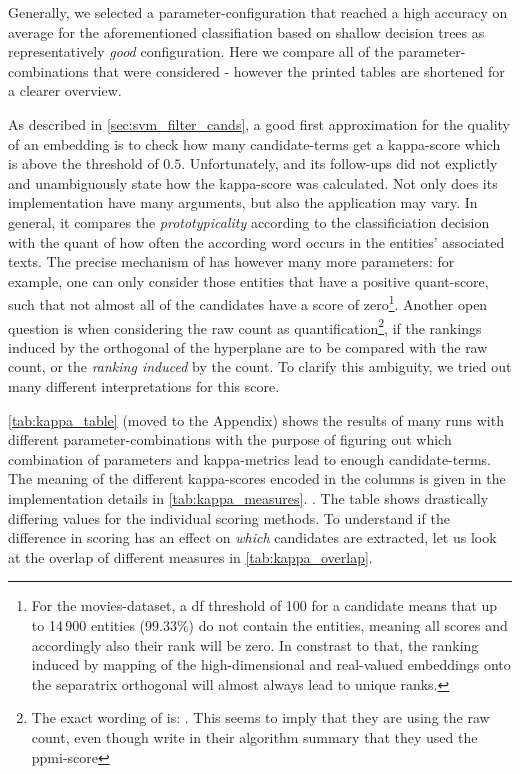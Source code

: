 Generally, we selected a parameter-configuration that reached a high accuracy on average for the aforementioned classifiation based on shallow decision trees as representatively \textit{good} configuration. Here we compare all of the parameter-combinations that were considered - however the printed tables are shortened for a clearer overview.

As described in \autoref{sec:svm_filter_cands}, a good first approximation for the quality of an embedding is to check how many candidate-terms get a kappa-score which is above the threshold of $0.5$. Unfortunately, \cite{Derrac2015} and its follow-ups \cite{Ager2018,Alshaikh2020} did not explictly and unambiguously state how the kappa-score was calculated. Not only does its implementation have many arguments, but also the application may vary. In general, it compares the \textit{prototypicality} according to the classificiation decision with the \gls{quant} of how often the according word occurs in the entities' associated texts. The precise mechanism of has however many more parameters: for example, one can only consider those entities that have a positive \gls{quant}-score, such that not almost all of the candidates have a score of zero\footnote{For the movies-dataset, a \gls{df} threshold of 100 for a candidate means that up to 14\,900 entities (99.33\%) do not contain the entities, meaning all scores and accordingly also their rank will be zero. In constrast to that, the ranking induced by mapping of the high-dimensional and real-valued embeddings onto the separatrix orthogonal will almost always lead to unique ranks.}. Another open question is when considering the raw count as quantification\footnote{The exact wording of \textcite{Derrac2015} is: \textit{}. This seems to imply that they are using the raw count, even though \cite{Ager2018,Alshaikh2020} write in their algorithm summary that they used the \gls{ppmi}-score}, if the rankings induced by the orthogonal of the hyperplane are to be compared with the raw count, or the \textit{ranking induced} by the count. To clarify this ambiguity, we tried out many different interpretations for this score. 

\autoref{tab:kappa_table} (moved to the Appendix) shows the results of many runs with different parameter-combinations with the purpose of figuring out which combination of parameters and kappa-metrics lead to enough candidate-terms. The meaning of the different kappa-scores encoded in the columns is given in the implementation details in \autoref{tab:kappa_measures}. . The table shows drastically differing values for the individual scoring methods. To understand if the difference in scoring has an effect on \textit{which} candidates are extracted, let us look at the overlap of different measures in \autoref{tab:kappa_overlap}. 


